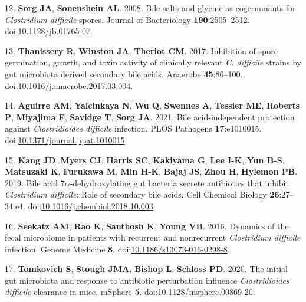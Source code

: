 \documentclass[
  12pt,
]{article}
\newenvironment{cslreferences}%
  {}%
  {\par}
\begin{document}
\begin{cslreferences}
\leavevmode\hypertarget{ref-Sorg2008}{}%
12. \textbf{Sorg JA}, \textbf{Sonenshein AL}. 2008. Bile salts and
glycine as cogerminants for \emph{Clostridium difficile} spores. Journal
of Bacteriology \textbf{190}:2505--2512.
doi:\href{https://doi.org/10.1128/jb.01765-07}{10.1128/jb.01765-07}.

\leavevmode\hypertarget{ref-Thanissery2017}{}%
13. \textbf{Thanissery R}, \textbf{Winston JA}, \textbf{Theriot CM}.
2017. Inhibition of spore germination, growth, and toxin activity of
clinically relevant \emph{C. difficile} strains by gut microbiota
derived secondary bile acids. Anaerobe \textbf{45}:86--100.
doi:\href{https://doi.org/10.1016/j.anaerobe.2017.03.004}{10.1016/j.anaerobe.2017.03.004}.

\leavevmode\hypertarget{ref-Aguirre2021}{}%
14. \textbf{Aguirre AM}, \textbf{Yalcinkaya N}, \textbf{Wu Q},
\textbf{Swennes A}, \textbf{Tessier ME}, \textbf{Roberts P},
\textbf{Miyajima F}, \textbf{Savidge T}, \textbf{Sorg JA}. 2021. Bile
acid-independent protection against \emph{Clostridioides difficile}
infection. PLOS Pathogens \textbf{17}:e1010015.
doi:\href{https://doi.org/10.1371/journal.ppat.1010015}{10.1371/journal.ppat.1010015}.

\leavevmode\hypertarget{ref-Kang2019}{}%
15. \textbf{Kang JD}, \textbf{Myers CJ}, \textbf{Harris SC},
\textbf{Kakiyama G}, \textbf{Lee I-K}, \textbf{Yun B-S},
\textbf{Matsuzaki K}, \textbf{Furukawa M}, \textbf{Min H-K},
\textbf{Bajaj JS}, \textbf{Zhou H}, \textbf{Hylemon PB}. 2019. Bile acid
7\(\alpha\)-dehydroxylating gut bacteria secrete antibiotics that
inhibit \emph{Clostridium difficile}: Role of secondary bile acids. Cell
Chemical Biology \textbf{26}:27--34.e4.
doi:\href{https://doi.org/10.1016/j.chembiol.2018.10.003}{10.1016/j.chembiol.2018.10.003}.

\leavevmode\hypertarget{ref-Seekatz2016}{}%
16. \textbf{Seekatz AM}, \textbf{Rao K}, \textbf{Santhosh K},
\textbf{Young VB}. 2016. Dynamics of the fecal microbiome in patients
with recurrent and nonrecurrent \emph{Clostridium difficile} infection.
Genome Medicine \textbf{8}.
doi:\href{https://doi.org/10.1186/s13073-016-0298-8}{10.1186/s13073-016-0298-8}.

\leavevmode\hypertarget{ref-Tomkovich2020}{}%
17. \textbf{Tomkovich S}, \textbf{Stough JMA}, \textbf{Bishop L},
\textbf{Schloss PD}. 2020. The initial gut microbiota and response to
antibiotic perturbation influence \emph{Clostridioides difficile}
clearance in mice. mSphere \textbf{5}.
doi:\href{https://doi.org/10.1128/msphere.00869-20}{10.1128/msphere.00869-20}.


\end{cslreferences}
\end{document}

